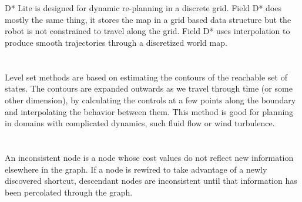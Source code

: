 \documentclass[12pt]{article}
\begin{document}
\section{} %

D* Lite is designed for dynamic re-planning in a discrete grid. Field D* does mostly the same thing, it stores the map in a grid based data structure but the robot is not constrained to travel along the grid. Field D* uses interpolation to produce smooth trajectories through a discretized world map.


\section{} %

Level set methods are based on estimating the contours of the reachable set of states. The contours are expanded outwards as we travel through time (or some other dimension), by calculating the controls at a few points along the boundary and interpolating the behavior between them. This method is good for planning in domains with complicated dynamics, such fluid flow or wind turbulence.


\section{} %

An inconsistent node is a node whose cost values do not reflect new information elsewhere in the graph. If a node is rewired to take advantage of a newly discovered shortcut, descendant nodes are inconsistent until that information has been percolated through the graph.
\end{document}
